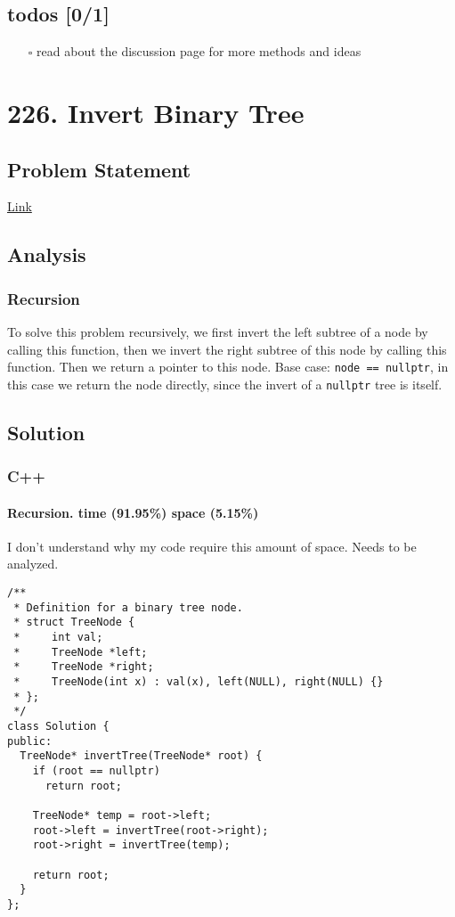 \documentclass[12pt]{book}
\begin{document}
\section{todos [0/1]}
\label{sec:orgc0a6c42}
\begin{itemize}
\item[{$\square$}] read about the discussion page for more methods and ideas
\end{itemize}
\chapter{226. Invert Binary Tree}
\label{sec:org2879f6a}
\section{Problem Statement}
\label{sec:org2f83362}
\href{https://leetcode.com/problems/invert-binary-tree/}{Link}
\section{Analysis}
\label{sec:org72faf16}
\subsection{Recursion}
\label{sec:orgd6ab5c5}
To solve this problem recursively, we first invert the left subtree of a node by calling this function, then we invert the right subtree of this node by calling this function. Then we return a pointer to this node. Base case: \texttt{node == nullptr}, in this case we return the node directly, since the invert of a \texttt{nullptr} tree is itself.
\section{Solution}
\label{sec:org21e9ae0}
\subsection{C++}
\label{sec:org3cea184}
\subsubsection{Recursion. time (91.95\%) space (5.15\%)}
\label{sec:org82b6e0a}
I don't understand why my code require this amount of space. Needs to be analyzed.
\begin{verbatim}
/**
 * Definition for a binary tree node.
 * struct TreeNode {
 *     int val;
 *     TreeNode *left;
 *     TreeNode *right;
 *     TreeNode(int x) : val(x), left(NULL), right(NULL) {}
 * };
 */
class Solution {
public:
  TreeNode* invertTree(TreeNode* root) {
    if (root == nullptr)
      return root;

    TreeNode* temp = root->left;
    root->left = invertTree(root->right);
    root->right = invertTree(temp);

    return root;
  }
};
\end{verbatim}
\end{document}
